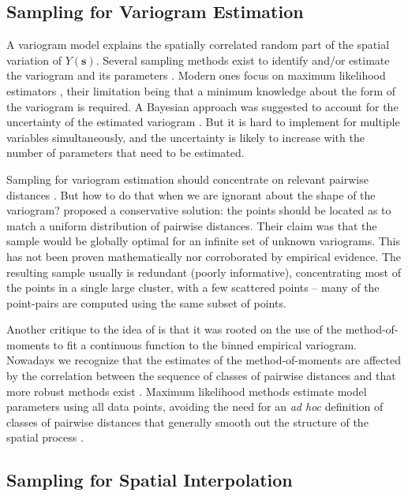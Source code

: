 \subsection{Sampling for Variogram Estimation}

A variogram model explains the spatially correlated random part of the spatial variation of 
$Y(\boldsymbol{s})$. Several sampling methods exist to identify and/or estimate the variogram and its 
parameters \cite{BrusEtAl1994, deGruijterEtAl2006, Mueller2007, WebsterEtAl2013}. Modern ones focus on maximum 
likelihood estimators \cite{Lark2002, Zimmerman2006, Mueller2007}, their limitation being that a minimum 
knowledge about the form of the variogram is required. A Bayesian approach was suggested to account for the 
uncertainty of the estimated variogram \cite{DiggleEtAl2006, MarchantEtAl2006, ZhuEtAl2006}. But it is hard to 
implement for multiple variables simultaneously, and the uncertainty is likely to increase with the number of 
parameters that need to be estimated.

Sampling for variogram estimation should concentrate on relevant pairwise distances \cite{MuellerEtAl1999, 
Lark2002}. But how to do that when we are ignorant about the shape of the variogram? \citet{BreslerEtAl1982, 
Russo1984, WarrickEtAl1987} proposed a conservative solution: the points should be located as to match a 
uniform distribution of pairwise distances. Their claim was that the sample would be globally optimal for an 
infinite set of unknown variograms. This has not been proven mathematically nor corroborated by empirical 
evidence. The resulting sample usually is redundant (poorly informative), concentrating most of the points in a 
single large cluster, with a few scattered points -- many of the point-pairs are computed using the same subset 
of points.

Another critique to the idea of \citet{BreslerEtAl1982, Russo1984, WarrickEtAl1987} is that it was rooted on 
the use of the method-of-moments to fit a continuous function to the binned empirical variogram. Nowadays we 
recognize that the estimates of the method-of-moments are affected by the correlation between the sequence of 
classes of pairwise distances and that more robust methods exist \cite{DiggleEtAl2002}. Maximum likelihood 
methods estimate model parameters using all data points, avoiding the need for an \textit{ad hoc} definition of 
classes of pairwise distances that generally smooth out the structure of the spatial process  
\cite{Lark2000}.

\subsection{Sampling for Spatial Interpolation}

